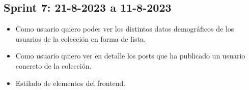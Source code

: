 \subsection{Sprint 7: 21-8-2023 a 11-8-2023}
\begin{itemize}
    \item Como usuario quiero poder ver los distintos datos demográficos de los usuarios de la colección en forma de lista.
    \item Como usuario quiero ver en detalle los posts que ha publicado un usuario concreto de la colección.
    \item Estilado de elementos del frontend.
\end{itemize}